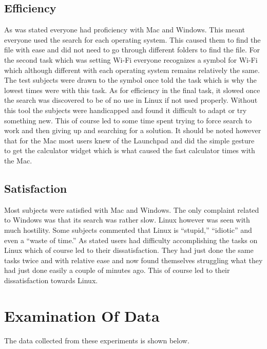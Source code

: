 \documentclass[11pt]{article}
\begin{document}
\subsection{Efficiency}
As was stated everyone had proficiency with Mac and Windows. This meant everyone used the search for each operating system. This caused them to find the file with ease and did not need to go through different folders to find the file. For the second task which was setting Wi-Fi everyone recognizes a symbol for Wi-Fi which although different with each operating system remains relatively the same. The test subjects were drawn to the symbol once told the task which is why the lowest times were with this task. As for efficiency in the final task, it slowed once the search was discovered to be of no use in Linux if not used properly. Without this tool the subjects were handicapped and found it difficult to adapt or try something new. This of course led to some time spent trying to force search to work and then giving up and searching for a solution. It should be noted however that for the Mac most users knew of the Launchpad and did the simple gesture to get the calculator widget which is what caused the fast calculator times with the Mac.

\subsection{Satisfaction}
Most subjects were satisfied with Mac and Windows. The only complaint related to Windows was that its search was rather slow. Linux however was seen with much hostility. Some subjects commented that Linux is ``stupid,'' ``idiotic'' and even a ``waste of time.''  As stated users had difficulty accomplishing the tasks on Linux which of course led to their dissatisfaction. They had just done the same tasks twice and with relative ease and now found themselves struggling what they had just done easily a couple of minutes ago. This of course led to their dissatisfaction towards Linux.

\section{Examination Of Data}
The data collected from these experiments is shown below.
\end{document}
